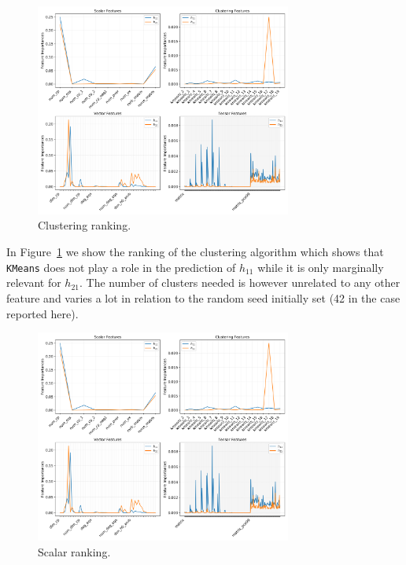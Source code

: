     \begin{figure}[!t]
        \centering
        \includegraphics[width=0.75\textwidth,
                         trim={6in 5in 0 0},
                         clip
                        ]{tex/img/feature_importances.png}
        \caption{Clustering ranking.}
        \label{fig:clustering_importances}
    \end{figure}
    
    In Figure~\ref{fig:clustering_importances} we show the ranking of the clustering algorithm which shows that \texttt{KMeans} does not play a role in the prediction of $h_{11}$ while it is only marginally relevant for $h_{21}$. The number of clusters needed is however unrelated to any other feature and varies a lot in relation to the random seed initially set (42 in the case reported here).
    
    \begin{figure}[!t]
        \centering
        \includegraphics[width=0.75\textwidth,
                         trim={0 5in 6in 0},
                         clip
                        ]{tex/img/feature_importances.png}
        \caption{Scalar ranking.}
        \label{fig:scalar_importances}
    \end{figure}
    
